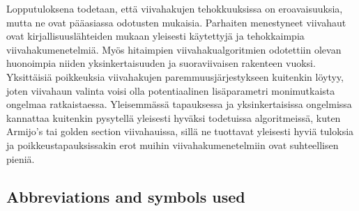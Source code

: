 \documentclass[english, 12pt, a4paper, sci, utf8, a-1b, online, table]{aaltothesis}
\begin{document}
\begin{abstractpage}[finnish]
  Lopputuloksena todetaan, että viivahakujen tehokkuuksissa on eroavaisuuksia, mutta ne ovat pääasiassa odotusten mukaisia. Parhaiten menestyneet viivahaut ovat kirjallisuuslähteiden mukaan yleisesti käytettyjä ja tehokkaimpia viivahakumenetelmiä. Myös hitaimpien viivahakualgoritmien odotettiin olevan huonoimpia niiden yksinkertaisuuden ja suoraviivaisen rakenteen vuoksi. Yksittäisiä poikkeuksia viivahakujen paremmuusjärjestykseen kuitenkin löytyy, joten viivahaun valinta voisi olla potentiaalinen lisäparametri monimutkaista ongelmaa ratkaistaessa. Yleisemmässä tapauksessa ja yksinkertaisissa ongelmissa kannattaa kuitenkin pysytellä yleisesti hyväksi todetuissa algoritmeissä, kuten Armijo's tai golden section viivahauissa, sillä ne tuottavat yleisesti hyviä tuloksia ja poikkeustapauksissakin erot muihin viivahakumenetelmiin ovat suhteellisen pieniä.
\end{abstractpage}

\newpage

\thesistableofcontents

\subsection*{Abbreviations and symbols used}
\end{document}
